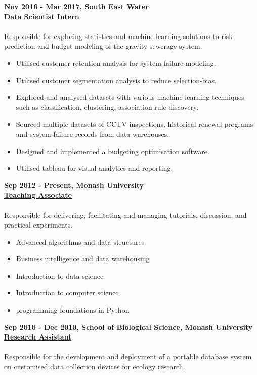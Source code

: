 \documentclass[a4paper,8pt,final]{memoir}
\newcommand{\Sep}{\vspace{1.5em}}
\newcommand{\CVItem}[1]
	{\textbf{\color{RoyalBlue} #1}}
\begin{document}
\CVItem{Nov 2016 - Mar 2017, South East Water}\\
\underline{\textbf{Data Scientist Intern}}\\
\\
Responsible for exploring statistics and machine learning solutions to risk prediction and budget modeling of the gravity sewerage system.
    \begin{itemize}
        \item Utilised customer retention analysis for system failure modeling.
        \item Utilised customer segmentation analysis to reduce selection-bias.
        \item Explored and analysed datasets with various machine learning techniques such as classification, clustering, association rule discovery.
        \item Sourced multiple datasets of CCTV inspections, historical renewal programs and system failure records from data warehouses.
        \item Designed and implemented a budgeting optimisation software.
        \item Utilised tableau for visual analytics and reporting.
    \end{itemize}
\Sep

\clearpage
\framebreak
\framebreak

\CVItem{Sep 2012 - Present, Monash University}\\
\underline{\textbf{Teaching Associate}}\\
\\
Responsible for delivering, facilitating and managing tutorials, discussion, and practical experiments.
    \begin{itemize}
        \item Advanced algorithms and data structures
        \item Business intelligence and data warehousing
        \item Introduction to data science
        \item Introduction to computer science
        \item programming foundations in Python
    \end{itemize}
\Sep

\CVItem{Sep 2010 - Dec 2010, School of Biological Science, Monash University}\\
\underline{\textbf{Research Assistant}}\\
\\
Responsible for the development and deployment of a portable database system on customised data collection devices for ecology research.
\Sep
\end{document}

